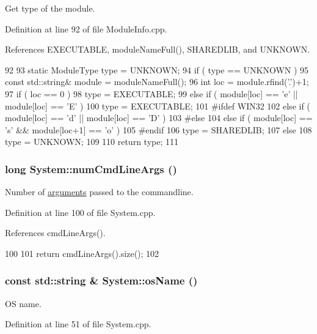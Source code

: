 Get type of the module. 

Definition at line 92 of file ModuleInfo.cpp.

References EXECUTABLE, moduleNameFull(), SHAREDLIB, and UNKNOWN.


\begin{DoxyCode}
92                                             {
93   static ModuleType type = UNKNOWN;
94   if ( type == UNKNOWN )    {
95     const std::string& module = moduleNameFull();
96     int loc = module.rfind('.')+1;
97     if ( loc == 0 )
98       type = EXECUTABLE;
99     else if ( module[loc] == 'e' || module[loc] == 'E' )
100       type = EXECUTABLE;
101 #ifdef WIN32
102     else if ( module[loc] == 'd' || module[loc] == 'D' )
103 #else
104     else if ( module[loc] == 's' && module[loc+1] == 'o' )
105 #endif
106       type = SHAREDLIB;
107     else
108       type = UNKNOWN;
109   }
110   return type;
111 }
\end{DoxyCode}
\hypertarget{namespaceSystem_a45f2f8ee27a6b62a7eb104306db16dc9}{
\subsubsection[{numCmdLineArgs}]{\setlength{\rightskip}{0pt plus 5cm}long System::numCmdLineArgs ()}}
\label{namespaceSystem_a45f2f8ee27a6b62a7eb104306db16dc9}


Number of \hyperlink{namespacearguments}{arguments} passed to the commandline. 

Definition at line 100 of file System.cpp.

References cmdLineArgs().


\begin{DoxyCode}
100                               {
101   return cmdLineArgs().size();
102 }
\end{DoxyCode}
\hypertarget{namespaceSystem_a08f605cda93733c3b7593517ed18557c}{
\subsubsection[{osName}]{\setlength{\rightskip}{0pt plus 5cm}const std::string \& System::osName ()}}
\label{namespaceSystem_a08f605cda93733c3b7593517ed18557c}


OS name. 

Definition at line 51 of file System.cpp.

